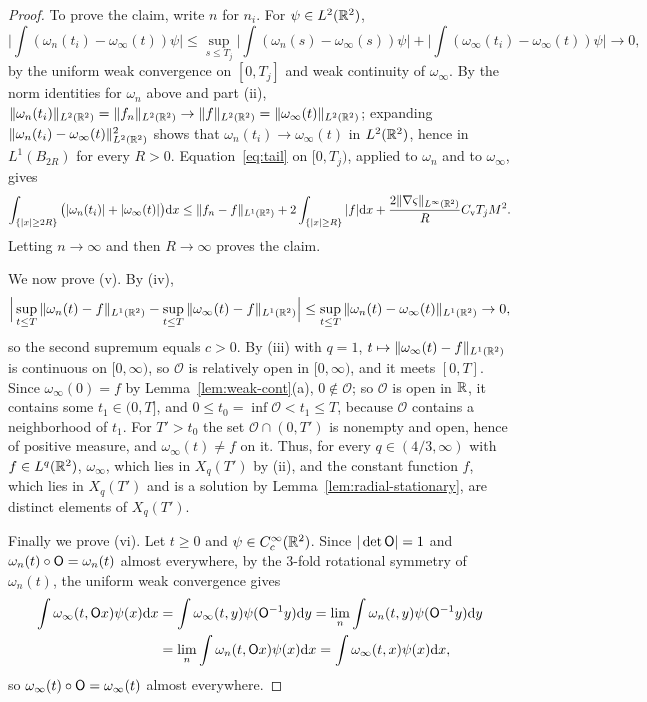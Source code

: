 \begin{proof}
To prove the claim, write $n$ for $n_i$. For $\psi\in L^2(\mathbb{R}^2)$,
\[
\Big|\int(\omega_n(t_i)-\omega_\infty(t))\psi\Big|
\le\sup_{s\le T_j}\Big|\int(\omega_n(s)-\omega_\infty(s))\psi\Big|
+\Big|\int(\omega_\infty(t_i)-\omega_\infty(t))\psi\Big|\to0 ,
\]
by the uniform weak convergence on $[0,T_j]$ and weak continuity of
$\omega_\infty$. By the norm identities for $\omega_n$ above and part (ii),
$\|\omega_n(t_i)\|_{L^2(\mathbb{R}^2)}=\|f_n\|_{L^2(\mathbb{R}^2)}\to\|f\|_{L^2(\mathbb{R}^2)}=\|\omega_\infty(t)\|_{L^2(\mathbb{R}^2)}$;
expanding $\|\omega_n(t_i)-\omega_\infty(t)\|_{L^2(\mathbb{R}^2)}^2$ shows that
$\omega_n(t_i)\to\omega_\infty(t)$ in $L^2(\mathbb{R}^2)$, hence in $L^1(B_{2R})$ for every
$R>0$. Equation~\eqref{eq:tail} on $[0,T_j)$,
applied to $\omega_n$ and to $\omega_\infty$, gives
\[
\int_{\{|x|\ge2R\}}\big(|\omega_n(t_i)|+|\omega_\infty(t)|\big)\dd x
\le\|f_n-f\|_{L^1(\mathbb{R}^2)}+2\int_{\{|x|\ge R\}}|f|\dd x
+\frac{2\|\nabla\varsigma\|_{L^\infty(\mathbb{R}^2)}}{R}C_{\mathrm v}T_jM^2 .
\]
Letting $n\to\infty$ and then $R\to\infty$ proves the claim.

We now prove (v). By (iv),
\[
\Big|\sup_{t\le T}\|\omega_n(t)-f\|_{L^1(\mathbb{R}^2)}-\sup_{t\le T}\|\omega_\infty(t)-f\|_{L^1(\mathbb{R}^2)}\Big|
\le\sup_{t\le T}\|\omega_n(t)-\omega_\infty(t)\|_{L^1(\mathbb{R}^2)}\to0 ,
\]
so the second supremum equals $c>0$. By (iii) with $q=1$,
$t\mapsto\|\omega_\infty(t)-f\|_{L^1(\mathbb{R}^2)}$ is continuous on $[0,\infty)$, so
$\mathcal O$ is relatively open in $[0,\infty)$, and it meets $[0,T]$. Since
$\omega_\infty(0)=f$ by Lemma~\ref{lem:weak-cont}(a), $0\notin\mathcal O$; so
$\mathcal O$ is open in $\mathbb{R}$, it contains some $t_1\in(0,T]$, and
$0\le t_0=\inf\mathcal O<t_1\le T$, because $\mathcal O$ contains a
neighborhood of $t_1$. For $T'>t_0$ the set $\mathcal O\cap(0,T')$ is
nonempty and open, hence of positive measure, and $\omega_\infty(t)\ne f$ on it.
Thus, for every $q\in(4/3,\infty)$ with $f\in L^q(\mathbb{R}^2)$, $\omega_\infty$, which lies
in $X_q(T')$ by (ii), and the constant function $f$, which lies in $X_q(T')$
and is a solution by Lemma~\ref{lem:radial-stationary}, are distinct
elements of $X_q(T')$.

Finally we prove (vi). Let $t\ge0$ and $\psi\in C_c^\infty(\mathbb{R}^2)$. Since
$|\det\mathsf{O}|=1$ and $\omega_n(t)\circ\mathsf{O}=\omega_n(t)$ almost everywhere, by
the $3$-fold rotational symmetry of $\omega_n(t)$, the uniform weak convergence gives
\begin{align*}
\int\omega_\infty(t,\mathsf{O} x)\psi(x)\dd x&=\int\omega_\infty(t,y)\psi(\mathsf{O}^{-1}y)\dd y
=\lim_n\int\omega_n(t,y)\psi(\mathsf{O}^{-1}y)\dd y\\
&=\lim_n\int\omega_n(t,\mathsf{O} x)\psi(x)\dd x=\int\omega_\infty(t,x)\psi(x)\dd x ,
\end{align*}
so $\omega_\infty(t)\circ\mathsf{O}=\omega_\infty(t)$ almost everywhere.
\end{proof}


